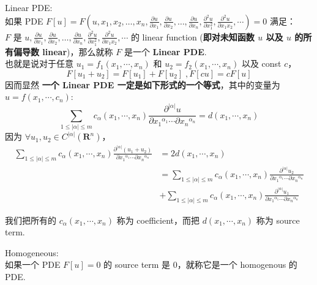 \documentclass[12pt]{article}
\begin{document}
\begin{defn}
    Linear PDE:
    \\
    如果 PDE $F[u] = F(u, x_1, x_2, \ldots, x_n, \frac{\partial u}{\partial x_1}, \frac{\partial u}{\partial x_2}, \ldots, \frac{\partial u}{\partial x_n}, \frac{\partial^2 u}{\partial x_1 ^ 2}, \frac{\partial^2 u}{\partial x_1 x_2 }, \cdots) = 0$ 
    满足：
    \\$F$ 是 $u, \frac{\partial u}{\partial x_1}, \frac{\partial u}{\partial x_2}, \ldots, \frac{\partial u}{\partial x_n}, \frac{\partial^2 u}{\partial x_1 ^ 2}, \frac{\partial^2 u}{\partial x_1 x_2 }, \cdots$ 的 linear function (\textbf{即对未知函数 $u$ 以及 $u$ 的所有偏导数 linear})，那么就称 $F$ 是一个 \textbf{Linear PDE}.
    \\ 也就是说对于任意 $u_1 = f_1(x_1, \cdots, x_n)$ 和 $u_2 = f_2(x_1, \cdots, x_n)$ 以及 const $c$，$$F[u_1 + u_2] = F[u_1] + F[u_2] \; , F[cu] = cF[u]$$
    因而显然 \textbf{一个 Linear PDE 一定是如下形式的一个等式}，其中的变量为 $u = f(x_1,  \cdots, c_n)$:
    $$
        \sum_{1 \leq |\alpha| \leq m} c_{\alpha}(x_1, \cdots, x_n) \frac{\partial ^ {|\alpha|} {u}}{\partial{x_1}^{\alpha_1} \cdots \partial{x_n}^{\alpha_n}} = d(x_1, \cdots, x_n)
    $$
    因为 $\forall u_1, u_2 \in C^{|\alpha|}(\mathbf{R}^n)$，
    \begin{align}
         \sum_{1 \leq |\alpha| \leq m} c_{\alpha}(x_1, \cdots, x_n) \frac{\partial ^ {|\alpha|} {(u_1 + u_2)}}{\partial{x_1}^{\alpha_1} \cdots \partial{x_n}^{\alpha_n}}
         &= 2d(x_1, \cdots, x_n) \\
         &= \sum_{1 \leq |\alpha| \leq m} c_{\alpha}(x_1, \cdots, x_n) \frac{\partial ^ {|\alpha|} {u_2}}{\partial{x_1}^{\alpha_1} \cdots \partial{x_n}^{\alpha_n}}\\
   & + \sum_{1 \leq |\alpha| \leq m} c_{\alpha}(x_1, \cdots, x_n) \frac{\partial ^ {|\alpha|} {u_1}}{\partial{x_1}^{\alpha_1} \cdots \partial{x_n}^{\alpha_n}}
    \end{align}
    
我们把所有的 $c_\alpha(x_1, \cdots, x_n)$ 称为 coefficient，而把 $d(x_1, \cdots, x_n)$ 称为 source term.
\end{defn}

\begin{defn}
    Homogeneous:
    \\如果一个 PDE $F[u] = 0 $ 的 source term 是 0，就称它是一个 homogenous 的 PDE.
\end{defn}
\end{document}
